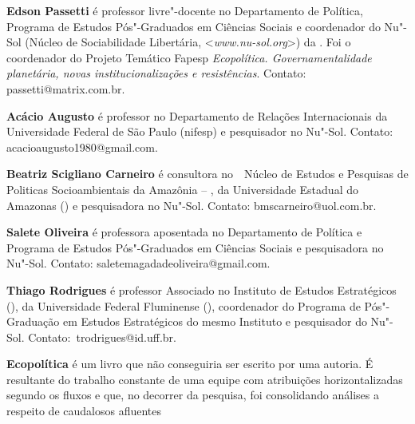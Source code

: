 \textbf{Edson Passetti} é professor livre"-docente no Departamento de Política, Programa de Estudos Pós"-Graduados em Ciências Sociais e coordenador do Nu"-Sol (Núcleo de Sociabilidade Libertária, \textless{}\emph{www.nu-sol.org}\textgreater{}) da . Foi o coordenador do Projeto Temático Fapesp \emph{Ecopolítica. Governamentalidade planetária, novas institucionalizações e resistências}. Contato: passetti@matrix.com.br.

\textbf{Acácio Augusto} é professor no Departamento de Relações Internacionais da Universidade Federal de São Paulo (nifesp) e pesquisador no Nu"-Sol. Contato: acacioaugusto1980@gmail.com.

\textbf{Beatriz Scigliano Carneiro} é consultora no  Núcleo de Estudos e Pesquisas de Politicas Socioambientais da Amazônia -- , da Universidade Estadual do Amazonas () e pesquisadora no Nu"-Sol. Contato: bmscarneiro@uol.com.br.

\textbf{Salete Oliveira} é professora aposentada no Departamento de Política e Programa de Estudos Pós"-Graduados em Ciências Sociais e pesquisadora no Nu"-Sol. Contato: saletemagadadeoliveira@gmail.com.

\textbf{Thiago Rodrigues} é professor Associado no Instituto de Estudos Estratégicos (), da Universidade Federal Fluminense (), coordenador do Programa de Pós"-Graduação em Estudos Estratégicos do mesmo Instituto e pesquisador do Nu"-Sol. Contato: trodrigues@id.uff.br.

\textbf{Ecopolítica} é um livro que não conseguiria ser escrito por uma autoria. É resultante do trabalho constante de uma equipe com atribuições horizontalizadas segundo os fluxos e que, no decorrer da pesquisa, foi consolidando análises a respeito de caudalosos afluentes






